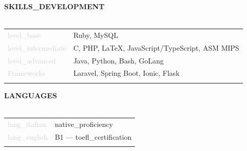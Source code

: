 \documentclass{article}
\begin{document}
\textbf{\textcolor{deepblue}{\uppercase{{{skills_development}}}}} \\\\ \hfill
\begin{tabular}{ R{4cm} L{11cm} }
	\textcolor{lightgray}{{{level_base}}} & Ruby, MySQL \\ \hfill
	\textcolor{lightgray}{{{level_intermediate}}} & C, PHP, LaTeX, JavaScript/TypeScript, ASM MIPS \\ \hfill
	\textcolor{lightgray}{{{level_advanced}}} & Java, Python, Bash, GoLang \\[.5cm] \hfill
	\textcolor{lightgray}{Frameworks} & Laravel, Spring Boot, Ionic, Flask \\ \hfill
\end{tabular}

\textbf{\textcolor{deepblue}{\uppercase{{{languages}}}}} \\\\ \hfill
\begin{tabular}{ R{4cm} L{11cm} }
	\textcolor{lightgray}{{{lang_italian}}} & {{native_proficiency}} \\ \hfill
	\textcolor{lightgray}{{{lang_english}}} & B1 — {{toefl_certification}}\\ \hfill
\end{tabular}
\end{document}
